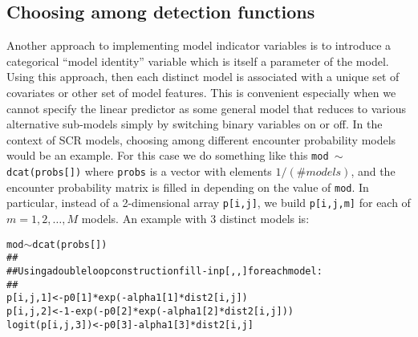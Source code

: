 {\begin{comment}
{\bf XXXXXXXXXXX TO BE DONE XXXXXXXXXX}

Discussion of sensitivity to prior ......
Results of DIC and model indicator variable analyses were based on
unif(-3,3) priors for the parameters. This keeps them in the ballpark
when they are not in the model. We tried a different prior:
normal(0,.1) which you can do just by editing the function
 \mbox{\tt wolvSCR0ms}.
Doing the DIC analysis changes the result to XXXXXXXXXXXXX

The indicator variable analysis was rerun and that produces XXXXXXXXXXXXXXX
We modified
 the {\bf R} script to run the same model
but with \mbox{\tt dnorm(0,.1)} prior distributions, producing the
following results:  {\bf XXXXX RERUN THIS XXXXXXX}
\begin{verbatim}
> mod <- toad5$BUGSoutput$sims.list$mod
> mod <- paste(mod[,1],mod[,2])
> table(mod)/length(mod)

mod
       0 0        0 1        1 0        1 1
0.43945000 0.02185000 0.50708333 0.03161667
\end{verbatim}
\end{comment}

\subsection{Choosing among detection functions}


Another approach to implementing model indicator variables is to
introduce a categorical ``model identity'' variable which is itself
 a parameter of the model. Using this approach, then each 
distinct model is associated with a unique set of covariates or
other set of model features. This is convenient especially when we
cannot specify the linear predictor as some general model that reduces
to various alternative sub-models simply by switching binary variables
on or off. In the context of SCR models, choosing among different
encounter probability models would be an example.  For this case we do
something like this \mbox{\tt mod  $\sim$  dcat(probs[])}
where \mbox{\tt probs} is a vector with elements $1/(\# models)$, and
the encounter probability matrix is filled in depending on the value
 of \mbox{\tt mod}.
In particular, instead of a 2-dimensional array
 \mbox{\tt p[i,j]},  we build \mbox{\tt p[i,j,m]} for each of
$m=1,2,\ldots,M$ models. An example with 3 distinct models is:
{\small
\begin{alltt}
  mod  \(\sim\) dcat(probs[])
\#\#
\#\# Using a double loop construction fill-in p[,,] for each model:
\#\#
  p[i,j,1] <-  p0[1]*exp( - alpha1[1]*dist2[i,j] )
  p[i,j,2] <-  1-exp(-p0[2]*exp( - alpha1[2]*dist2[i,j] ) )
  logit(p[i,j,3]) <- p0[3] - alpha1[3]*dist2[i,j]


\end{alltt}}}

